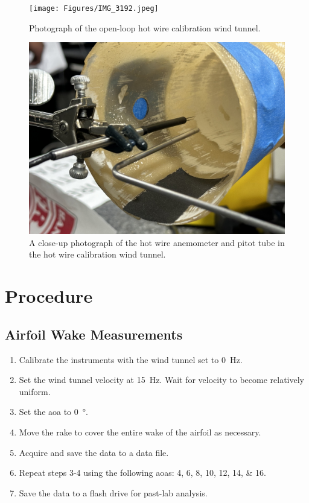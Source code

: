 \begin{figure}[htpb]
    \centering
    \texttt{[image: Figures/IMG\_3192.jpeg]}
    \caption[Image of the small open Circuit wind tunnel.]{Photograph of the open-loop hot wire calibration wind tunnel.}
    \label{fig: OpenCircutWindTunnel}
\end{figure}

\begin{figure}[htpb]
    \centering
    \includegraphics[width=0.75\linewidth]{Figures/IMG_3199.jpeg}
    \caption[Image of the Hot Wire Anemometer inside of open Circuit wind tunnel.]{A close-up photograph of the hot wire anemometer and pitot tube in the hot wire calibration wind tunnel.}
    \label{fig: HotWireAndPitot}
\end{figure}

\section{Procedure}\label{sec:procedures}
\subsection{Airfoil Wake Measurements}
\begin{enumerate}
\item Calibrate the instruments with the wind tunnel set to \qty{0}{\hertz}.
\item Set the wind tunnel velocity at \qty{15}{\hertz}. Wait for velocity to become relatively uniform. 
\item Set the \acrshort{aoa} to \qty{0}{\degree}.
\item Move the rake to cover the entire wake of the airfoil as necessary.
\item Acquire and save the data to a data file.
\item Repeat steps 3-4 using the following \acrshort{aoa}s: \numlist{4;6;8;10;12;14;16}.
\item Save the data to a flash drive for past-lab analysis.
\end{enumerate}


